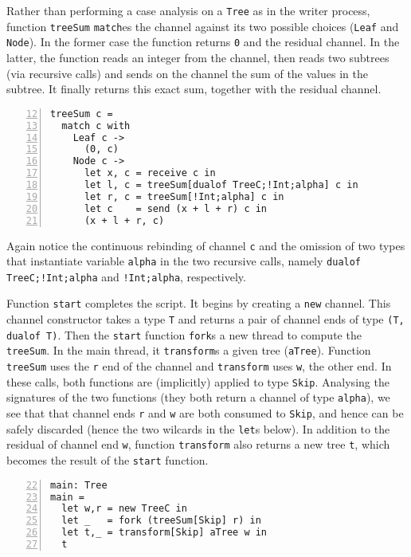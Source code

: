 Rather than performing a case analysis on a \lstinline|Tree| as in the
writer process, function \lstinline|treeSum| \lstinline|match|es the
channel against its two possible choices (\lstinline|Leaf| and
\lstinline|Node|). In the former case the function returns
\lstinline|0| and the residual channel. In the latter, the function
reads an integer from the channel, then reads two subtrees (via
recursive calls) and sends on the channel the sum of the values in the
subtree. It finally returns this exact sum, together with the residual
channel.
%
\label{lst:treeSum}
\begin{lstlisting}[numbers=left,firstnumber=12]
treeSum c =
  match c with
    Leaf c ->
      (0, c)
    Node c ->
      let x, c = receive c in
      let l, c = treeSum[dualof TreeC;!Int;alpha] c in
      let r, c = treeSum[!Int;alpha] c in
      let c    = send (x + l + r) c in
      (x + l + r, c)
\end{lstlisting}

Again notice the continuous rebinding of channel \lstinline|c| and the
omission of two types that instantiate variable \lstinline|alpha| in
the two recursive calls, namely \lstinline|dualof TreeC;!Int;alpha|
and \lstinline|!Int;alpha|, respectively.

Function \lstinline|start| completes the script. It begins by creating
a \lstinline|new| channel. This channel constructor takes a type
\lstinline|T| and returns a pair of channel ends of type
%
\lstinline|(T, dualof T)|. Then the \lstinline|start| function
\lstinline|fork|s a new thread to compute the \lstinline|treeSum|. In
the main thread, it \lstinline|transform|s a given tree
(\lstinline|aTree|). Function \lstinline|treeSum| uses the
\lstinline|r| end of the channel and \lstinline|transform| uses
\lstinline|w|, the other end. In these calls, both functions are
(implicitly) applied to type \lstinline|Skip|. Analysing the
signatures of the two functions (they both return a channel of type
\lstinline|alpha|), we see that that channel ends \lstinline|r| and
\lstinline|w| are both consumed to \lstinline|Skip|, and hence can be
safely discarded (hence the two wilcards in the \lstinline|let|s
below). In addition to the residual of channel end \lstinline|w|,
function \lstinline|transform| also returns a new tree \lstinline|t|,
which becomes the result of the \lstinline|start| function.
%
\begin{lstlisting}[numbers=left,firstnumber=22]
main: Tree
main =
  let w,r = new TreeC in
  let _   = fork (treeSum[Skip] r) in
  let t,_ = transform[Skip] aTree w in
  t
\end{lstlisting}

